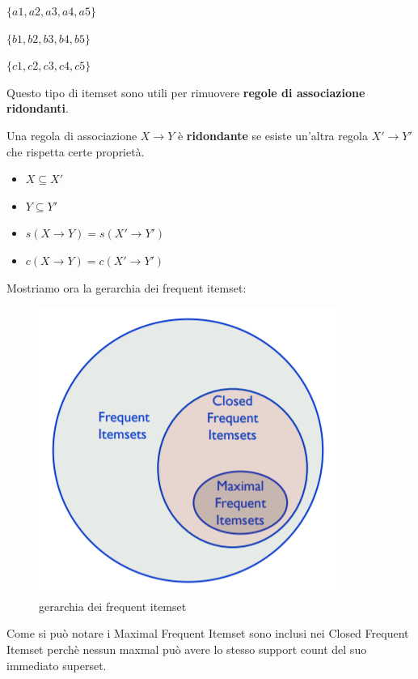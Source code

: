 $\{a1,a2,a3,a4,a5\}$

$\{b1,b2,b3,b4,b5\}$

$\{c1,c2,c3,c4,c5\}$


Questo tipo di itemset sono utili per rimuovere \textbf{regole di associazione ridondanti}. 
\begin{defn}
	Una regola di associazione $X \rightarrow Y$ \`e \textbf{ridondante} se esiste un'altra regola $X' \rightarrow Y'$ che rispetta certe propriet\`a. 
	\begin{itemize}
		\item $X \subseteq X'$
		\item $Y \subseteq Y'$
		\item $s(X \rightarrow Y)  = s(X' \rightarrow Y')$
		\item $c(X \rightarrow Y)  = c(X' \rightarrow Y')$
	\end{itemize}
\end{defn}

Mostriamo ora la gerarchia dei frequent itemset:
\begin{figure}[H]
	\centering
	\includegraphics[height=0.45 \linewidth]{association/pict/itemset_freq.png}
	\caption{gerarchia dei frequent itemset}
\end{figure}

Come si può notare i Maximal Frequent Itemset sono inclusi nei Closed Frequent Itemset perchè nessun maxmal può avere lo stesso support count del suo immediato superset.
